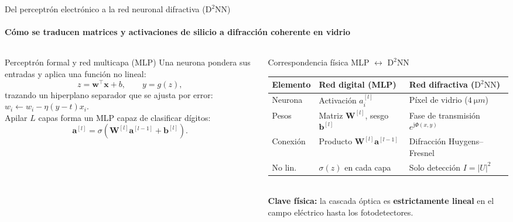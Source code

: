 \documentclass[aspectratio=169,10pt]{beamer}
\newcommand{\jj}{\mathrm{j}}
\begin{document}
\begin{frame}{Del perceptrón electrónico a la red neuronal difractiva ($\text{D}^2\text{NN}$)}
\framesubtitle{Cómo se traducen matrices y activaciones de silicio a difracción coherente en vidrio}
\begin{columns}[T,onlytextwidth]
  \begin{column}{0.45\textwidth}
    \begin{caja}{Perceptrón formal y red multicapa (MLP)}
      \scriptsize
      Una neurona pondera sus entradas y aplica una función no lineal:
      \[
        z=\mathbf{w}^\top\mathbf{x}+b,\qquad y=g(z),
      \]
      trazando un hiperplano separador que se ajusta por error: $w_i\leftarrow w_i-\eta(y-t)x_i$.\\[3pt]
      Apilar $L$ capas forma un MLP capaz de clasificar dígitos:
      \[
        \mathbf{a}^{[l]}=\sigma\!\left(\mathbf{W}^{[l]}\mathbf{a}^{[l-1]}+\mathbf{b}^{[l]}\right).
      \]
    \end{caja}
  \end{column}
  \begin{column}{0.53\textwidth}
    \begin{azulbox}{Correspondencia física MLP $\leftrightarrow$ $\text{D}^2\text{NN}$}
      \scriptsize\setlength{\tabcolsep}{3.5pt}
      \begin{tabular}{@{}lll@{}}
        \toprule
        Elemento & Red digital (MLP) & Red difractiva ($\text{D}^2\text{NN}$)\\
        \midrule
        Neurona & Activación $a_i^{[l]}$ & Píxel de vidrio ($\SI{4}{\micro m}$)\\
        Pesos & Matriz $\mathbf{W}^{[l]}$, sesgo $\mathbf{b}^{[l]}$ & Fase de transmisión $e^{\jj\Phi(x,y)}$\\
        Conexión & Producto $\mathbf{W}^{[l]}\mathbf{a}^{[l-1]}$ & Difracción Huygens--Fresnel\\
        No lin. & $\sigma(z)$ en cada capa & Solo detección $I=|U|^2$\\
        \bottomrule
      \end{tabular}\\[4pt]
      \textbf{Clave física:} la cascada óptica es \textbf{estrictamente lineal} en el campo eléctrico hasta los fotodetectores.
    \end{azulbox}
  \end{column}
\end{columns}
\end{frame}
\end{document}
